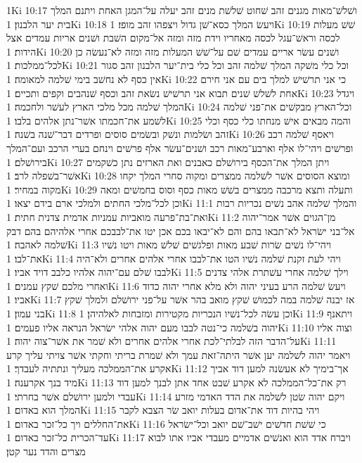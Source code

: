 1Ki 10:17  ושׁלשׁ־מאות מגנים זהב שׁחוט שׁלשׁת מנים זהב יעלה על־המגן האחת ויתנם המלך בית יער הלבנון׃
1Ki 10:18  ויעשׂ המלך כסא־שׁן גדול ויצפהו זהב מופז׃
1Ki 10:19  שׁשׁ מעלות לכסה וראשׁ־עגל לכסה מאחריו וידת מזה ומזה אל־מקום השׁבת ושׁנים אריות עמדים אצל הידות׃
1Ki 10:20  ושׁנים עשׂר אריים עמדים שׁם על־שׁשׁ המעלות מזה ומזה לא־נעשׂה כן לכל־ממלכות׃
1Ki 10:21  וכל כלי משׁקה המלך שׁלמה זהב וכל כלי בית־יער הלבנון זהב סגור אין כסף לא נחשׁב בימי שׁלמה למאומה׃
1Ki 10:22  כי אני תרשׁישׁ למלך בים עם אני חירם אחת לשׁלשׁ שׁנים תבוא אני תרשׁישׁ נשׂאת זהב וכסף שׁנהבים וקפים ותכיים׃
1Ki 10:23  ויגדל המלך שׁלמה מכל מלכי הארץ לעשׁר ולחכמה׃
1Ki 10:24  וכל־הארץ מבקשׁים את־פני שׁלמה לשׁמע את־חכמתו אשׁר־נתן אלהים בלבו׃
1Ki 10:25  והמה מבאים אישׁ מנחתו כלי כסף וכלי זהב ושׂלמות ונשׁק ובשׂמים סוסים ופרדים דבר־שׁנה בשׁנה׃
1Ki 10:26  ויאסף שׁלמה רכב ופרשׁים ויהי־לו אלף וארבע־מאות רכב ושׁנים־עשׂר אלף פרשׁים וינחם בערי הרכב ועם־המלך בירושׁלם׃
1Ki 10:27  ויתן המלך את־הכסף בירושׁלם כאבנים ואת הארזים נתן כשׁקמים אשׁר־בשׁפלה לרב׃
1Ki 10:28  ומוצא הסוסים אשׁר לשׁלמה ממצרים ומקוה סחרי המלך יקחו מקוה במחיר׃
1Ki 10:29  ותעלה ותצא מרכבה ממצרים בשׁשׁ מאות כסף וסוס בחמשׁים ומאה וכן לכל־מלכי החתים ולמלכי ארם בידם יצאו׃
1Ki 11:1  והמלך שׁלמה אהב נשׁים נכריות רבות ואת־בת־פרעה מואביות עמניות אדמית צדנית חתית׃
1Ki 11:2  מן־הגוים אשׁר אמר־יהוה אל־בני ישׂראל לא־תבאו בהם והם לא־יבאו בכם אכן יטו את־לבבכם אחרי אלהיהם בהם דבק שׁלמה לאהבה׃
1Ki 11:3  ויהי־לו נשׁים שׂרות שׁבע מאות ופלגשׁים שׁלשׁ מאות ויטו נשׁיו את־לבו׃
1Ki 11:4  ויהי לעת זקנת שׁלמה נשׁיו הטו את־לבבו אחרי אלהים אחרים ולא־היה לבבו שׁלם עם־יהוה אלהיו כלבב דויד אביו׃
1Ki 11:5  וילך שׁלמה אחרי עשׁתרת אלהי צדנים ואחרי מלכם שׁקץ עמנים׃
1Ki 11:6  ויעשׂ שׁלמה הרע בעיני יהוה ולא מלא אחרי יהוה כדוד אביו׃
1Ki 11:7  אז יבנה שׁלמה במה לכמושׁ שׁקץ מואב בהר אשׁר על־פני ירושׁלם ולמלך שׁקץ בני עמון׃
1Ki 11:8  וכן עשׂה לכל־נשׁיו הנכריות מקטירות ומזבחות לאלהיהן׃
1Ki 11:9  ויתאנף יהוה בשׁלמה כי־נטה לבבו מעם יהוה אלהי ישׂראל הנראה אליו פעמים׃
1Ki 11:10  וצוה אליו על־הדבר הזה לבלתי־לכת אחרי אלהים אחרים ולא שׁמר את אשׁר־צוה יהוה׃
1Ki 11:11  ויאמר יהוה לשׁלמה יען אשׁר היתה־זאת עמך ולא שׁמרת בריתי וחקתי אשׁר צויתי עליך קרע אקרע את־הממלכה מעליך ונתתיה לעבדך׃
1Ki 11:12  אך־בימיך לא אעשׂנה למען דוד אביך מיד בנך אקרענה׃
1Ki 11:13  רק את־כל־הממלכה לא אקרע שׁבט אחד אתן לבנך למען דוד עבדי ולמען ירושׁלם אשׁר בחרתי׃
1Ki 11:14  ויקם יהוה שׂטן לשׁלמה את הדד האדמי מזרע המלך הוא באדום׃
1Ki 11:15  ויהי בהיות דוד את־אדום בעלות יואב שׂר הצבא לקבר את־החללים ויך כל־זכר באדום׃
1Ki 11:16  כי שׁשׁת חדשׁים ישׁב־שׁם יואב וכל־ישׂראל עד־הכרית כל־זכר באדום׃
1Ki 11:17  ויברח אדד הוא ואנשׁים אדמיים מעבדי אביו אתו לבוא מצרים והדד נער קטן׃
